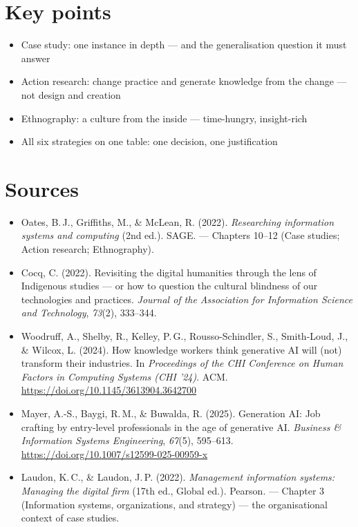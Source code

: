 \documentclass[11pt,a4paper,british,twoside=false,headings=small,chapterprefix=false,numbers=noenddot]{scrbook}
\begin{document}
\section*{Key points}
\begin{itemize}
  \item Case study: one instance in depth --- and the generalisation question it must answer
  \item Action research: change practice and generate knowledge from the change --- not design and creation
  \item Ethnography: a culture from the inside --- time-hungry, insight-rich
  \item All six strategies on one table: one decision, one justification
\end{itemize}

\section*{Sources}
\begin{itemize}\small
  \item Oates, B.\,J., Griffiths, M., \& McLean, R. (2022). \emph{Researching information systems and computing} (2nd ed.). SAGE. --- Chapters 10--12 (Case studies; Action research; Ethnography).
  \item Cocq, C. (2022). Revisiting the digital humanities through the lens of Indigenous studies --- or how to question the cultural blindness of our technologies and practices. \emph{Journal of the Association for Information Science and Technology}, \emph{73}(2), 333--344.
  \item Woodruff, A., Shelby, R., Kelley, P.\,G., Rousso-Schindler, S., Smith-Loud, J., \& Wilcox, L. (2024). How knowledge workers think generative AI will (not) transform their industries. In \emph{Proceedings of the CHI Conference on Human Factors in Computing Systems (CHI '24)}. ACM. \url{https://doi.org/10.1145/3613904.3642700}
  \item Mayer, A.-S., Baygi, R.\,M., \& Buwalda, R. (2025). Generation AI: Job crafting by entry-level professionals in the age of generative AI. \emph{Business \& Information Systems Engineering}, \emph{67}(5), 595--613. \url{https://doi.org/10.1007/s12599-025-00959-x}
  \item Laudon, K.\,C., \& Laudon, J.\,P. (2022). \emph{Management information systems: Managing the digital firm} (17th ed., Global ed.). Pearson. --- Chapter 3 (Information systems, organizations, and strategy) --- the organisational context of case studies.
\end{itemize}
\end{document}

